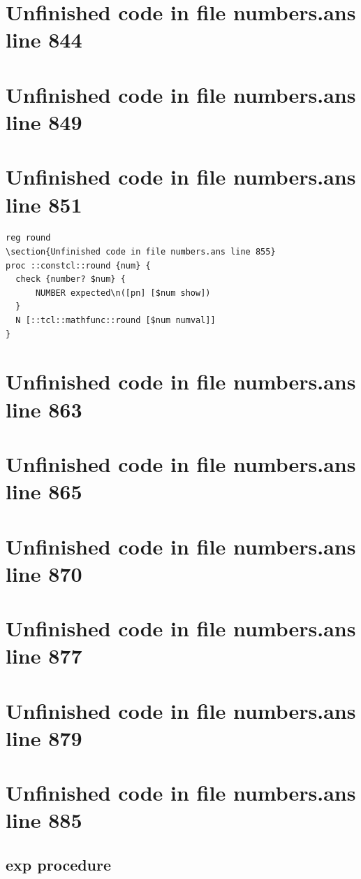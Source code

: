 \documentclass[twoside,9pt]{report}
\begin{document}
\section{Unfinished code in file numbers.ans line 844}
\section{Unfinished code in file numbers.ans line 849}
\section{Unfinished code in file numbers.ans line 851}
\begin{lstlisting}
reg round
\section{Unfinished code in file numbers.ans line 855}
proc ::constcl::round {num} {
  check {number? $num} {
      NUMBER expected\n([pn] [$num show])
  }
  N [::tcl::mathfunc::round [$num numval]]
}
\end{lstlisting}
\section{Unfinished code in file numbers.ans line 863}
\section{Unfinished code in file numbers.ans line 865}
\section{Unfinished code in file numbers.ans line 870}
\section{Unfinished code in file numbers.ans line 877}
\section{Unfinished code in file numbers.ans line 879}
\section{Unfinished code in file numbers.ans line 885}
\subsection{exp procedure}
\label{exp-procedure}
\end{document}
